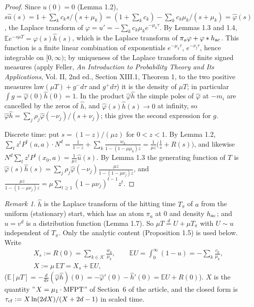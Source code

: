 \documentclass[11pt,a4paper]{article}
\theoremstyle{definition}
\theoremstyle{remark}
\newtheorem{remark}[theorem]{Remark}
\begin{document}
\begin{proof}
Since $u(0)=0$ (Lemma 1.2), $s\hat u(s)=1+\sum_kc_ks/(s+\mu_k)=(1+\sum_kc_k)-\sum_kc_k\mu_k/(s+\mu_k)=\hat\varphi(s)$, the Laplace transform of $\varphi=u'=-\sum_kc_k\mu_ke^{-\mu_k\tau}$. By Lemmas 1.3 and 1.4, $\mathbb E e^{-s\mu T}=\hat\varphi(s)\hat h(s)$, which is the Laplace transform of $\pi_a\varphi+\varphi*h_{\rm ac}$. This function is a finite linear combination of exponentials $e^{-\mu_k\tau}$, $e^{-\nu_j\tau}$, hence integrable on $[0,\infty)$; by uniqueness of the Laplace transform of finite signed measures (apply Feller, \emph{An Introduction to Probability Theory and Its Applications}, Vol. II, 2nd ed., Section XIII.1, Theorem 1, to the two positive measures law$(\mu T)+g^-d\tau$ and $g^+d\tau$) it is the density of $\mu T$; in particular $\int g=\hat\varphi(0)\hat h(0)=1$. In the product $\hat\varphi\hat h$ the simple poles of $\hat\varphi$ at $-m_i$ are cancelled by the zeros of $\hat h$, and $\hat\varphi(s)\hat h(s)\to0$ at infinity, so $\hat\varphi\hat h=\sum_j\rho_j\hat\varphi(-\nu_j)/(s+\nu_j)$; this gives the second expression for $g$.

Discrete time: put $s=(1-z)/(\mu z)$ for $0<z<1$. By Lemma 1.2, $\sum_tz^tP^t(a,a)\cdot N^d=\frac1{1-z}+\sum_k\frac{w_k}{1-(1-\mu\mu_k)z}=\frac1{\mu z}\bigl(\frac1s+R(s)\bigr)$, and likewise $N^d\sum_tz^tP^t(x_0,a)=\frac1{\mu z}\hat u(s)$. By Lemma 1.3 the generating function of $T$ is $\hat\varphi(s)\hat h(s)=\sum_j\rho_j\hat\varphi(-\nu_j)\frac{\mu z}{1-(1-\mu\nu_j)z}$, and $\frac{\mu z}{1-(1-\mu\nu_j)z}=\mu\sum_{t\ge1}(1-\mu\nu_j)^{t-1}z^t$.
\end{proof}

\begin{remark}
$\hat h$ is the Laplace transform of the hitting time $T_\pi$ of $a$ from the uniform (stationary) start, which has an atom $\pi_a$ at $0$ and density $h_{\rm ac}$; and $u=v^d$ is a distribution function (Lemma 1.7). So $\mu T\overset{d}{=}U+\mu T_\pi$ with $U\sim u$ independent of $T_\pi$. Only the analytic content (Proposition 1.5) is used below. Write
\begin{gather*}
X_s:=R(0)=\sum_{k\in\mathcal K}\frac{w_k}{\mu_k}, \qquad \mathbb E U=\int_0^\infty(1-u)=-\sum_{k}\frac{c_k}{\mu_k}, \\
X:=\mu\,\mathbb E T=X_s+\mathbb E U,
\end{gather*}
($\mathbb E[\mu T]=-\frac{d}{ds}(\hat\varphi\hat h)(0)=-\hat\varphi'(0)-\hat h'(0)=\mathbb EU+R(0)$). $X$ is the quantity ''$X=\mu_1\cdot{\rm MFPT}$'' of Section~6 of the article, and the closed form is $\tau_{\rm cf}:=X\ln(2dX)/(X+2d-1)$ in scaled time.

\end{remark}
\end{document}
